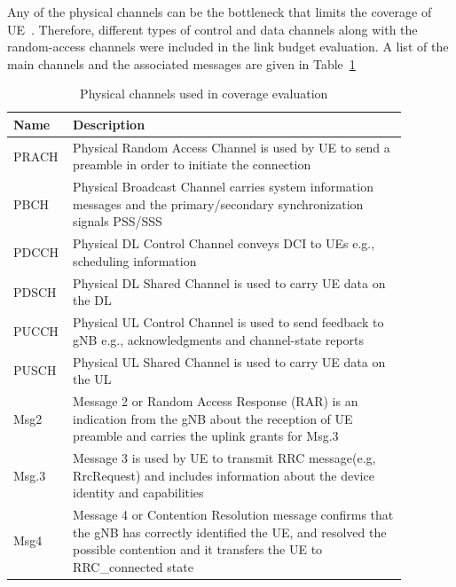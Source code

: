 \documentclass[]{IEEEtran}
\begin{document}
Any of the physical channels can be the bottleneck that limits the coverage of UE~\cite{moloudi_coverage_2021}.
Therefore, different types of control and data channels along with the random-access channels were included in the link budget evaluation.
A list of the main channels and the associated messages are given in Table~\ref{table:coverage-evaluation-physical-channels}~\cite{3gpp_study_2021_38.875}
\begin{table}
\centering
\caption{Physical channels used in coverage evaluation}
\begin{tabular}{| m{0.08\linewidth}  m{0.8\linewidth}|} 
 \hline
    \textbf{Name}  &  \textbf{Description} \\
\hline
    PRACH & Physical Random Access Channel is used by UE to send a preamble in order to initiate the connection\\
\hline
    PBCH & Physical Broadcast Channel carries system information messages and the primary/secondary synchronization signals PSS/SSS\\
\hline
    PDCCH & Physical DL Control Channel conveys DCI to UEs e.g., scheduling information \\
\hline
    PDSCH &  Physical DL Shared Channel is used to carry UE data on the DL\\
\hline
    PUCCH &  Physical UL Control Channel is used to send feedback to gNB e.g., acknowledgments and channel-state reports\\
\hline
    PUSCH &  Physical UL Shared Channel is used to carry UE data on the UL\\
\hline
    Msg2 &  Message 2 or Random Access Response (RAR) is an indication from the gNB about the reception of UE preamble and carries the uplink grants for Msg.3\\
\hline
    Msg.3 &  Message 3 is used by UE to transmit RRC message(e.g, RrcRequest) and includes information about the device identity and capabilities\\ 
\hline
    Msg4 &  Message 4 or Contention Resolution message confirms that the gNB has correctly identified the UE, and resolved the possible contention and it transfers the UE to RRC\_connected state\\
\hline
\end{tabular}
\label{table:coverage-evaluation-physical-channels}
\end{table}
\end{document}
